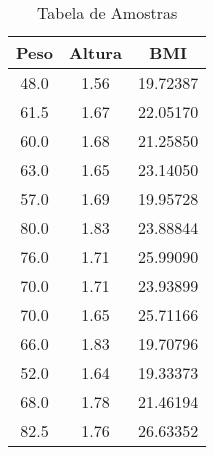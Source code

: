 \documentclass[12pt, a4paper]{article}
\begin{document}
\begin{table}
\centering
\begin{tabular}{|c|c|c|}
\hline
\rule[-1.0ex]{0pt}{4.0ex}
\textbf{Peso}&\textbf{Altura}&\textbf{BMI}\\ \hline
\rule[-1.0ex]{0pt}{4.0ex}
48.0   &	1.56	&	19.72387 \\ \hline
\rule[-1.0ex]{0pt}{4.0ex}
61.5   &	1.67	&	22.05170 \\ \hline
\rule[-1.0ex]{0pt}{4.0ex}
60.0   & 	1.68	&	21.25850 \\ \hline
\rule[-1.0ex]{0pt}{4.0ex}
63.0   &	1.65	&	23.14050 \\ \hline
\rule[-1.0ex]{0pt}{4.0ex}
57.0   &	1.69	&	19.95728 \\ \hline
\rule[-1.0ex]{0pt}{4.0ex}
80.0   &	1.83	&	23.88844 \\ \hline
\rule[-1.0ex]{0pt}{4.0ex}
76.0   &	1.71	&	25.99090 \\ \hline
\rule[-1.0ex]{0pt}{4.0ex}
70.0   &	1.71	&	23.93899 \\ \hline
\rule[-1.0ex]{0pt}{4.0ex}
70.0   &	1.65	&	25.71166 \\ \hline
\rule[-1.0ex]{0pt}{4.0ex}
66.0   &	1.83	&	19.70796 \\ \hline
\rule[-1.0ex]{0pt}{4.0ex}
52.0   &	1.64	&	19.33373 \\ \hline
\rule[-1.0ex]{0pt}{4.0ex}
68.0   &	1.78	&	21.46194 \\ \hline
\rule[-1.0ex]{0pt}{4.0ex}
82.5   &	1.76	&	26.63352 \\ \hline
\end{tabular}
\caption{Tabela de Amostras}
\label{table:amostra}
\end{table}
\end{document}
